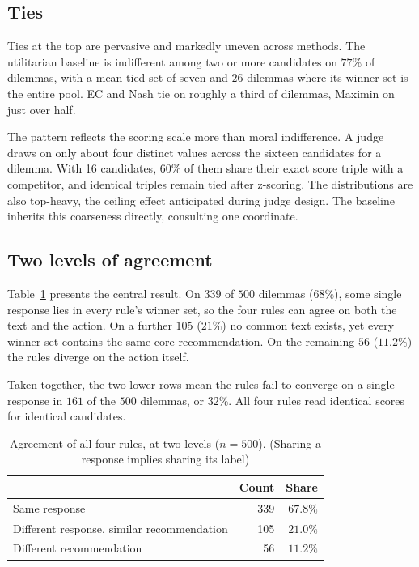 \documentclass[10pt,twocolumn,a4paper]{article}
\begin{document}
\subsection{Ties}
\label{sec:results-ties}



Ties at the top are pervasive and markedly uneven across methods. The
utilitarian baseline is indifferent among two or more candidates on
$77\%$ of dilemmas, with a mean tied set of seven and $26$ dilemmas
where its winner set is the entire pool. EC and Nash tie on roughly a
third of dilemmas, Maximin on just over half.

The pattern reflects the scoring scale more than moral indifference.
A judge draws on only about four distinct values
across the sixteen candidates for a dilemma. With 16 candidates, 60\% of
them share their exact score triple with a competitor,
and identical triples remain tied after z-scoring. The distributions are also top-heavy, the
ceiling effect anticipated during judge design. The baseline inherits
this coarseness directly, consulting one coordinate.

\subsection{Two levels of agreement}
\label{sec:results-two-levels}


Table~\ref{tab:two-levels} presents the central result. On $339$ of $500$
dilemmas ($68\%$), some single response lies in every rule's winner set, so
the four rules can agree on both the text and the action. On a further $105$
($21\%$) no common text exists, yet every winner set contains the same
core recommendation. On the remaining $56$ ($11.2\%$) the rules diverge on
the action itself.

Taken together, the two lower rows mean the rules fail to converge on a
single response in $161$ of the $500$ dilemmas, or $32\%$. All four
rules read identical scores for identical candidates.
\begin{table}[htbp]
\centering
\small
\caption{Agreement of all four rules, at two levels ($n = 500$). (Sharing
a response implies sharing its label)}
\label{tab:two-levels}
\vspace{2pt}
\begin{tabular}{@{}l r r@{}}
\toprule
 & \textbf{Count} & \textbf{Share} \\
\midrule
Same response                             & 339 & $67.8\%$ \\
Different response, similar recommendation   & 105 & $21.0\%$ \\
Different recommendation                  & 56  & $11.2\%$ \\
\bottomrule
\end{tabular}
\end{table}
\end{document}
